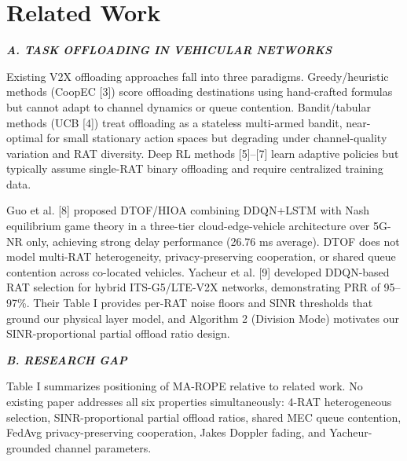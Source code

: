 \section{Related Work}

\textbf{\textit{A. TASK OFFLOADING IN VEHICULAR NETWORKS}}

Existing V2X offloading approaches fall into three paradigms. Greedy/heuristic methods (CoopEC [3]) score offloading destinations using hand-crafted formulas but cannot adapt to channel dynamics or queue contention. Bandit/tabular methods (UCB [4]) treat offloading as a stateless multi-armed bandit, near-optimal for small stationary action spaces but degrading under channel-quality variation and RAT diversity. Deep RL methods [5]--[7] learn adaptive policies but typically assume single-RAT binary offloading and require centralized training data.

Guo et al. [8] proposed DTOF/HIOA combining DDQN+LSTM with Nash equilibrium game theory in a three-tier cloud-edge-vehicle architecture over 5G-NR only, achieving strong delay performance (26.76 ms average). DTOF does not model multi-RAT heterogeneity, privacy-preserving cooperation, or shared queue contention across co-located vehicles. Yacheur et al. [9] developed DDQN-based RAT selection for hybrid ITS-G5/LTE-V2X networks, demonstrating PRR of 95--97\%. Their Table I provides per-RAT noise floors and SINR thresholds that ground our physical layer model, and Algorithm 2 (Division Mode) motivates our SINR-proportional partial offload ratio design.

\textbf{\textit{B. RESEARCH GAP}}

Table I summarizes positioning of MA-ROPE relative to related work. No existing paper addresses all six properties simultaneously: 4-RAT heterogeneous selection, SINR-proportional partial offload ratios, shared MEC queue contention, FedAvg privacy-preserving cooperation, Jakes Doppler fading, and Yacheur-grounded channel parameters.

